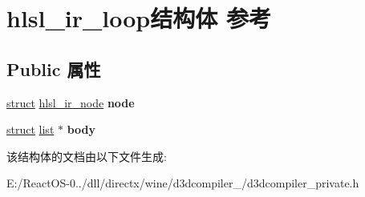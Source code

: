 \hypertarget{structhlsl__ir__loop}{}\section{hlsl\+\_\+ir\+\_\+loop结构体 参考}
\label{structhlsl__ir__loop}
\subsection*{Public 属性}
\begin{DoxyCompactItemize}
\item 
\mbox{\label{structhlsl__ir__loop_a8f73922aff45cd9f542d9e259a6209f0}} 
\hyperlink{interfacestruct}{struct} \hyperlink{structhlsl__ir__node}{hlsl\+\_\+ir\+\_\+node} {\bfseries node}
\item 
\mbox{\label{structhlsl__ir__loop_a58981d83b87193077efde4e2ed1fe6d3}} 
\hyperlink{interfacestruct}{struct} \hyperlink{classlist}{list} $\ast$ {\bfseries body}
\end{DoxyCompactItemize}


该结构体的文档由以下文件生成\+:\begin{DoxyCompactItemize}
\item 
E\+:/\+React\+O\+S-\/0../dll/directx/wine/d3dcompiler\+\_/d3dcompiler\+\_\+private.\+h\end{DoxyCompactItemize}
